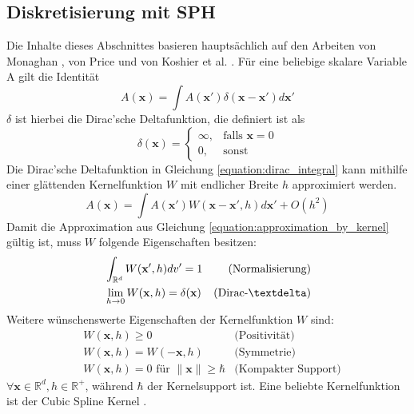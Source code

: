 \documentclass[11pt,
a4paper,
parskip=half, %
BCOR=10mm, %
english,
ngerman]{scrreprt}
\begin{document}
\subsection{Diskretisierung mit SPH}
Die Inhalte dieses Abschnittes basieren hauptsächlich auf den Arbeiten
von Monaghan \cite{monaghan_smoothed_2005}, von Price \cite{price_smoothed_2012} und von Koshier et al. \cite{koschier_smoothed_2020}.
Für eine beliebige skalare Variable A gilt die Identität
\begin{equation}
    \label{equation:dirac_integral}
    A(\textbf{x}) = \int A(\textbf{x}') \delta(\textbf{x} - \textbf{x}') d\textbf{x}'
\end{equation}
$\delta$ ist hierbei die Dirac'sche Deltafunktion, die definiert ist als
\begin{equation}
    \delta(\textbf{x}) = \begin{cases}
        \infty, &\text{falls } \textbf{x} = 0\\
        0, &\text{sonst}
    \end{cases}
\end{equation}
Die Dirac'sche Deltafunktion in Gleichung \ref{equation:dirac_integral} kann mithilfe einer glättenden Kernelfunktion $W$ mit endlicher Breite $h$ approximiert werden.
\begin{equation}
    \label{equation:approximation_by_kernel}
    A(\textbf{x}) = \int A(\textbf{x}') W(\textbf{x} - \textbf{x}', h) d\textbf{x}' + O(h^2)
\end{equation}
Damit die Approximation aus Gleichung \ref{equation:approximation_by_kernel} gültig ist, muss $W$ folgende Eigenschaften besitzen:
\begin{align}
    &\int_{\mathbb{R}^d} W(\textbf{x}', h)dv' = 1 & \text{(Normalisierung)}\\
    &\lim_{h \to 0} W(\textbf{x}, h) = \delta(\textbf{x}) & \text{(Dirac-\textdelta)}
\end{align}
Weitere wünschenswerte Eigenschaften der Kernelfunktion $W$ sind:
\begin{align}
    &W(\textbf{x}, h) \geq 0 & \text{(Positivität)}\\
    &W(\textbf{x}, h) = W(-\textbf{x}, h) & \text{(Symmetrie)}\\
    &W(\textbf{x}, h) = 0 \text{ für } \| \textbf{x} \| \geq \hbar & \text{(Kompakter Support)}
\end{align}
$\forall \textbf{x} \in \mathbb{R}^d, h \in \mathbb{R}^+$, während $\hbar$ der Kernelsupport ist.
Eine beliebte Kernelfunktion ist der Cubic Spline Kernel \cite{monaghan_smoothed_1992}.
\end{document}
